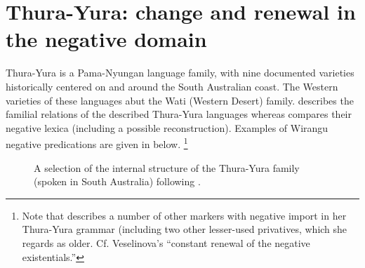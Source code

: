 \documentclass[output=paper,draft,draftmode,colorlinks,citecolor=brown]{langscibook}
\begin{document}
\section{Thura-Yura: change and renewal in the negative domain}\label{sec:austr-3}

        Thura-Yura is a Pama-Nyungan language family, with nine documented
varieties historically centered on and around the South Australian
coast. The Western varieties of these languages abut the Wati
(Western Desert) family.  describes the
familial relations of the described Thura-Yura languages whereas
 compares their negative lexica (including a
        possible reconstruction). Examples of Wirangu negative predications
are given in  below.%
\footnote{Note that \citet[57]{Hercus1999} describes a number of other
        markers with negative import in her Thura-Yura grammar (including
        two other lesser-used privatives, which she regards as older.
        Cf. Veselinova's \citeyearpar[173]{Veselinova2016}
        ``constant renewal of the negative existentials.''}

	\begin{figure}\centering
		\caption{A selection of the internal structure of the Thura-Yura family (spoken in South Australia) following \citealt[183]{SimpsonHercus2004}.}\label{fig:austr-thurayura-tree}\small
	\end{figure}
    
\end{document}
